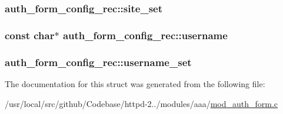 \subsubsection[{\texorpdfstring{site\+\_\+set}{site_set}}]{ auth\+\_\+form\+\_\+config\+\_\+rec\+::site\+\_\+set}\hypertarget{structauth__form__config__rec_a651f4f76113872a50f778d13fe2cc541}{}\label{structauth__form__config__rec_a651f4f76113872a50f778d13fe2cc541}
\subsubsection[{\texorpdfstring{username}{username}}]{\setlength{\rightskip}{0pt plus 5cm}const char$\ast$ auth\+\_\+form\+\_\+config\+\_\+rec\+::username}\hypertarget{structauth__form__config__rec_a19cbc6524a61f3a5ed5f0621c2da6702}{}\label{structauth__form__config__rec_a19cbc6524a61f3a5ed5f0621c2da6702}
\subsubsection[{\texorpdfstring{username\+\_\+set}{username_set}}]{ auth\+\_\+form\+\_\+config\+\_\+rec\+::username\+\_\+set}\hypertarget{structauth__form__config__rec_a45d87400df3c836df3664554b3bd9664}{}\label{structauth__form__config__rec_a45d87400df3c836df3664554b3bd9664}


The documentation for this struct was generated from the following file\+:\begin{DoxyCompactItemize}
\item 
/usr/local/src/github/\+Codebase/httpd-\/2../modules/aaa/\hyperlink{mod__auth__form_8c}{mod\+\_\+auth\+\_\+form.\+c}\end{DoxyCompactItemize}
